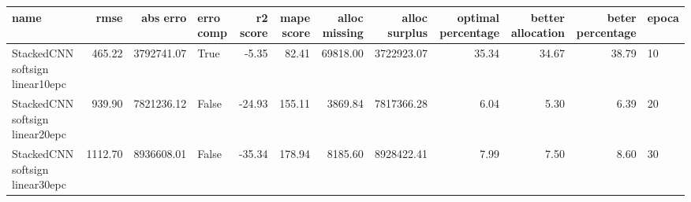 \begin{tabular}{lrrlrrrrrrrl}
\toprule
name & rmse & abs erro & erro comp & r2 score & mape score & alloc missing & alloc surplus & optimal percentage & better allocation & beter percentage & epoca \\
\midrule
StackedCNN softsign linear10epc & 465.22 & 3792741.07 & True & -5.35 & 82.41 & 69818.00 & 3722923.07 & 35.34 & 34.67 & 38.79 & 10 \\
StackedCNN softsign linear20epc & 939.90 & 7821236.12 & False & -24.93 & 155.11 & 3869.84 & 7817366.28 & 6.04 & 5.30 & 6.39 & 20 \\
StackedCNN softsign linear30epc & 1112.70 & 8936608.01 & False & -35.34 & 178.94 & 8185.60 & 8928422.41 & 7.99 & 7.50 & 8.60 & 30 \\
\bottomrule
\end{tabular}
